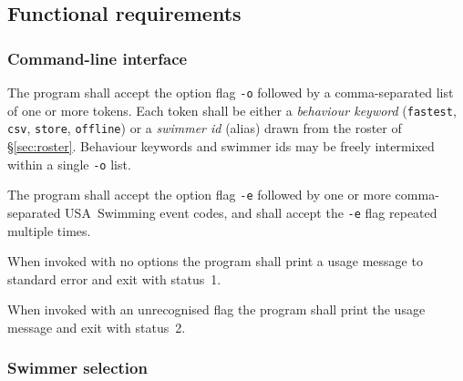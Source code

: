 \documentclass[12pt]{article}
\newcommand{\code}[1]{\texttt{#1}}
\newcommand{\req}[1]{\textbf{[#1]}}
\begin{document}
\subsection{Functional requirements}

\subsubsection{Command-line interface}

\begin{description}[style=nextline]
  \item[\req{REQ-F-01}] The program shall accept the option flag
        \code{-o} followed by a comma-separated list of one or more
        tokens.  Each token shall be either a \emph{behaviour keyword}
        (\code{fastest}, \code{csv}, \code{store}, \code{offline}) or a
        \emph{swimmer id} (alias) drawn from the roster of
        \S\ref{sec:roster}.  Behaviour keywords and swimmer ids may be
        freely intermixed within a single \code{-o} list.
  \item[\req{REQ-F-02}] The program shall accept the option flag
        \code{-e} followed by one or more comma-separated
        USA~Swimming event codes, and shall accept the \code{-e}
        flag repeated multiple times.
  \item[\req{REQ-F-03}] When invoked with no options the program
        shall print a usage message to standard error and exit
        with status~1.
  \item[\req{REQ-F-04}] When invoked with an unrecognised flag the
        program shall print the usage message and exit with status~2.
\end{description}

\subsubsection{Swimmer selection}
\end{document}
